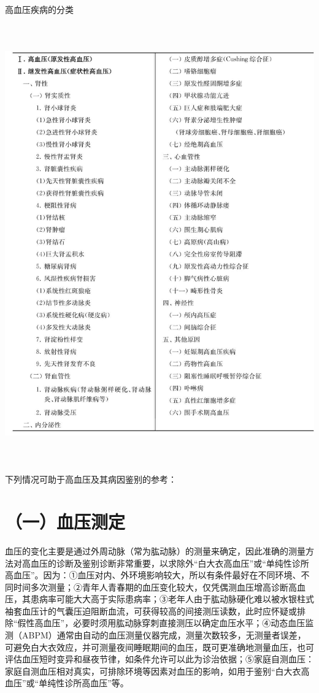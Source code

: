 \begin{table}[htbp]
\centering
\caption{高血压疾病的分类}
\label{tab12-2}
\includegraphics[width=5.97917in,height=7.4375in]{./images/Image00083.jpg}
\end{table}

下列情况可助于高血压及其病因鉴别的参考：

\section{（一）血压测定}

血压的变化主要是通过外周动脉（常为肱动脉）的测量来确定，因此准确的测量方法对高血压的诊断及鉴别诊断非常重要，以求除外“白大衣高血压”或“单纯性诊所高血压”。因为：①血压对内、外环境影响较大，所以有条件最好在不同环境、不同时间多次测量；②青年人青春期的血压变化较大，仅凭偶测血压增高诊断高血压，其患病率可能大大高于实际患病率；③老年人由于肱动脉硬化难以被水银柱式袖套血压计的气囊压迫阻断血流，可获得较高的间接测压读数，此时应怀疑或排除“假性高血压”，必要时须用肱动脉穿刺直接测压以确定血压水平；④动态血压监测（ABPM）通常由自动的血压测量仪器完成，测量次数较多，无测量者误差，可避免白大衣效应，并可测量夜间睡眠期间的血压，既可更准确地测量血压，也可评估血压短时变异和昼夜节律，如条件允许可以此为诊治依据；⑤家庭自测血压：家庭自测血压相对真实，可排除环境等因素对血压的影响，如用于鉴别“白大衣高血压”或“单纯性诊所高血压”等。

